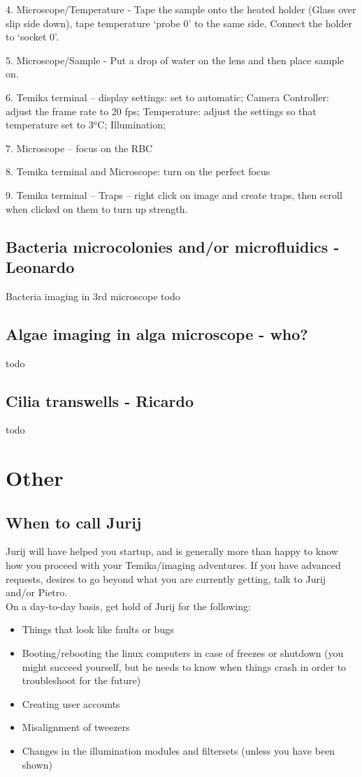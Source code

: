 \documentclass{report}
\begin{document}
4.    Microscope/Temperature - Tape the sample onto the heated holder (Glass over slip side down), tape temperature `probe 0' to the same side. Connect the holder to `socket 0'.


5.    Microscope/Sample - Put a drop of water on the lens and then place sample on.



6.    Temika terminal –     display settings: set to automatic;    Camera Controller: adjust the frame rate to 20 fps;     Temperature: adjust the settings so that temperature set to 3$^o$C;
Illumination;

7.    Microscope – focus on the RBC

8.    Temika terminal and  Microscope: turn on the perfect focus

9.    Temika terminal – Traps – right click on image and create traps, then scroll when clicked on them to turn up strength.


\section{Bacteria microcolonies and/or microfluidics  - Leonardo}
Bacteria imaging in 3rd microscope todo

\section{Algae imaging in alga microscope  - who?}
todo

\section{Cilia transwells  - Ricardo}
todo





\chapter{Other}

\section{When to call Jurij}
Jurij will have helped you startup, and is generally more than happy to know how you proceed with your Temika/imaging adventures.   If you have advanced requests, desires to go beyond what you are currently getting,  talk to Jurij and/or Pietro.   \\

On a day-to-day basis, get hold of Jurij for the following:
\begin{itemize}
  \item Things that look like faults or bugs
  \item Booting/rebooting the linux computers in case of freezes or shutdown  (you might succeed yourself, but he needs to know when things crash in order to troubleshoot for the future)
  \item  Creating user accounts
  \item   Misalignment of tweezers
  \item  Changes in the illumination modules and filtersets (unless you have been shown)
\end{itemize}
\end{document}
